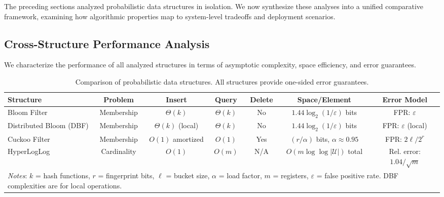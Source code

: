 The preceding sections analyzed probabilistic data structures in isolation. We now synthesize these analyses into a unified comparative framework, examining how algorithmic properties map to system-level tradeoffs and deployment scenarios.

\subsection{Cross-Structure Performance Analysis}

We characterize the performance of all analyzed structures in terms of asymptotic complexity, space efficiency, and error guarantees.

\begin{table}[t]
    \centering
    \small
    \begin{tabular}{|l|c|c|c|c|c|c|}
        \hline
        \textbf{Structure}      & \textbf{Problem} & \textbf{Insert}     & \textbf{Query} & \textbf{Delete} & \textbf{Space/Element}                   & \textbf{Error Model}                                                              \\
        \hline
        Bloom Filter            & Membership       & $\Theta(k)$         & $\Theta(k)$    & No              & $1.44 \log_2(1/\varepsilon)$ bits        & FPR: $\varepsilon$                                                                \\
        Distributed Bloom (DBF) & Membership       & $\Theta(k)$ (local) & $\Theta(k)$    & No              & $1.44 \log_2(1/\varepsilon)$ bits        & FPR: $\varepsilon$ (local)                                                        \\
        Cuckoo Filter           & Membership       & $O(1)$ amortized    & $O(1)$         & Yes             & $(r/\alpha)$ bits, $\alpha \approx 0.95$ & FPR: $2\ell/2^r$                                                                  \\
        HyperLogLog             & Cardinality      & $O(1)$              & $O(m)$         & N/A             & $O(m \log \log |\mathcal{U}|)$ total     & Rel. error: $1.04/\sqrt{m}$                                                       \\
        \hline
        \multicolumn{7}{|l|}{\textit{Notes}: $k$ = hash functions, $r$ = fingerprint bits, $\ell$ = bucket size, $\alpha$ = load factor, $m$ = registers, $\varepsilon$ = false positive rate. DBF complexities are for local operations.} \\
        \hline
    \end{tabular}
    \caption{Comparison of probabilistic data structures. All structures provide one-sided error guarantees.}
\end{table}

